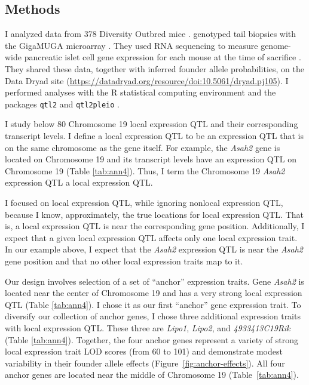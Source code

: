 \documentclass[oneside]{book}\usepackage[]{graphicx}\usepackage[]{color}
\begin{document}
\subsection{Methods}


I analyzed data from 378 Diversity Outbred mice \citep{keller2018genetic}. \citet{keller2018genetic} genotyped tail biopsies with the GigaMUGA microarray \citep{morgan2016mouse}. They used RNA sequencing to measure genome-wide pancreatic islet cell gene expression for each mouse at the time of sacrifice \citep{keller2018genetic}. They shared these data, together with inferred founder allele probabilities, on the Data Dryad site (\url{https://datadryad.org/resource/doi:10.5061/dryad.pj105}). I performed analyses with the R statistical computing environment \citep{r} and the packages \texttt{qtl2} \citep{broman2019rqtl2} and \texttt{qtl2pleio} \citep{qtl2pleio}.


I study below 80 Chromosome 19 local expression QTL and their corresponding transcript levels. I define a local expression QTL to be an expression QTL that is on the same chromosome as the gene itself. For example, the \emph{Asah2} gene is located on Chromosome 19 and its transcript levels have an expression QTL on Chromosome 19 (Table \ref{tab:ann4}). Thus, I term the Chromosome 19 \emph{Asah2} expression QTL a local expression QTL.

I focused on local expression QTL, while ignoring nonlocal expression QTL, 
because I know, approximately, the true locations for local expression QTL. 
That is, a local expression QTL is near the corresponding gene position. 
Additionally, I expect that a given local expression QTL affects only one local expression trait. 
In our example above, I expect that the \emph{Asah2} expression QTL is near the \emph{Asah2} gene 
position and that no other local expression traits map to it.


Our design involves selection of a set of ``anchor'' expression traits. Gene \emph{Asah2} is located near the center of Chromosome 19 and has a very strong local expression QTL (Table \ref{tab:ann4}). I chose it as our first ``anchor'' gene expression trait. To diversify our collection of anchor genes, I chose three additional expression traits with local expression QTL. These three are \emph{Lipo1}, \emph{Lipo2}, and \emph{4933413C19Rik} (Table \ref{tab:ann4}). Together, the four anchor genes represent a variety of strong local expression trait LOD scores (from 60 to 101) and demonstrate modest variability in their founder allele effects (Figure~\ref{fig:anchor-effects}). All four anchor genes are located near the middle of Chromosome 19 (Table~\ref{tab:ann4}).
\end{document}
